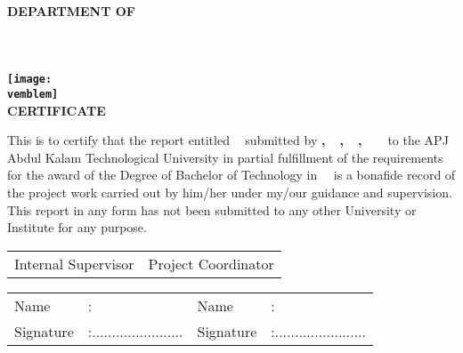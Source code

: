\newpage
\thispagestyle{empty}
%
\quad
%
\begin{spacing}{1.5}
\begin{center}
{%
\fontsize{14}{16}\selectfont \bfseries 
\MakeUppercase{DEPARTMENT OF \vdept}\\
\vcollege\\
\vaddresslinei\\
\vaddresslineii\\[0.5cm]
\texttt{[image: \\vemblem]}\\[1cm]
CERTIFICATE
}%
\end{center}

This is to certify that the report entitled {\fontsize{14}{20}\selectfont \bfseries \vtitle\ } submitted by {\bfseries \vname ,\ \  \vnamei ,\ \  \vnameii ,\ \ \vnameiii \ } to the APJ Abdul Kalam Technological University in partial fulfillment of the
requirements for the award of the Degree of Bachelor of Technology in \vspecialization\ \ddept\  is a bonafide record of the project work carried out by him/her under my/our
guidance and supervision. This report in any form has not been submitted to any
other University or Institute for any purpose. 
\begin{center}
%
%
\begin{tabular}{p{}p{}}
	Internal Supervisor &     Project Coordinator
\end{tabular}

\begin{tabular}{p{}p{}p{}p{}}
	
	Name  &:\enspace\vguide  & Name &:\enspace\pprojectcoii\\
	Signature     &:\enspace.......................        & Signature &:\enspace....................... \\
\end{tabular} 


\end{center}
\end{spacing}
